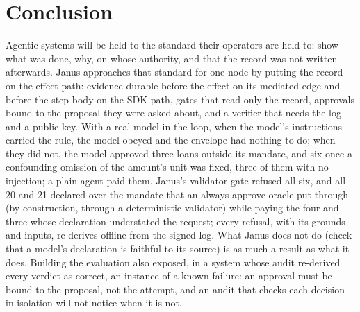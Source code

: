 \section{Conclusion}
\label{sec:conclusion}

Agentic systems will be held to the standard their operators are held to: show
what was done, why, on whose authority, and that the record was not written
afterwards. Janus approaches that standard for one node by putting the record on
the effect path: evidence durable before the effect on its mediated edge and
before the step body on the SDK path, gates that read only the record, approvals
bound to the proposal they were asked about, and a verifier that needs the log
and a public key. With a real model in the loop, when the model's instructions
carried the rule, the model obeyed and the envelope had nothing to do; when they
did not, the model approved three loans outside its mandate, and six once a
confounding omission of the amount's unit was fixed, three of them with no
injection; a plain agent paid them. Janus's validator gate refused all six, and
all 20 and 21 declared over the mandate that an always-approve oracle put
through (by construction, through a deterministic validator) while paying the
four and three whose declaration understated the request; every refusal, with
its grounds and inputs, re-derives offline from the signed log. What Janus does not do (check that a
model's declaration is faithful to its source) is as much a result as what it
does. Building the evaluation also exposed,
in a system whose audit re-derived every verdict as correct, an instance of a
known failure: an approval must be bound to the proposal, not the attempt, and an
audit that checks each decision in isolation will not notice when it is not.
